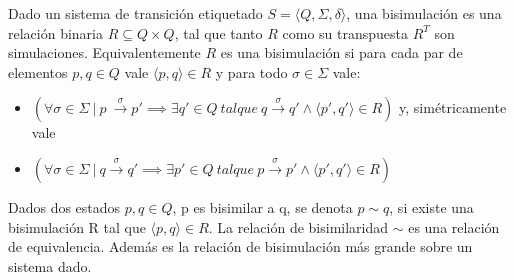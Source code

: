 \begin{definition}[Bisimulación]
Dado un sistema de transición etiquetado $ S =\langle Q, \Sigma, \delta \rangle $, una bisimulación es una relación binaria $R \subseteq Q \times Q$, tal que tanto $R$ como su transpuesta $R^T$ son simulaciones. Equivalentemente $R$ es una bisimulación si para cada par de elementos $p, q \in Q$ vale $\langle p, q \rangle \in R$ y para todo $\sigma \in \Sigma $ vale:
\begin{itemize}
    \item $(\forall \sigma \in \Sigma \  | \  p \ \overset{\sigma}{\rightarrow} p' \implies \exists q'\in Q \ \mathit{tal que} \ q \overset{\sigma}{\rightarrow} q' \land \langle p', q' \rangle \in R )$ y, simétricamente vale 
    \item $(\forall \sigma \in \Sigma \  | \  q \overset{\sigma}{\rightarrow} q' \implies \exists p'\in Q \ \mathit{tal que} \ p \overset{\sigma}{\rightarrow} p' \land \langle p', q' \rangle \in R ) $
\end{itemize}

Dados dos estados $p, q \in Q $, p es bisimilar a q, se denota $p \sim q $, si existe una bisimulación R tal que $\langle p,q \rangle \in R$. La relación de bisimilaridad $\sim$ es una relación de equivalencia. Además es la relación de bisimulación más grande sobre un sistema dado.

\end{definition}

